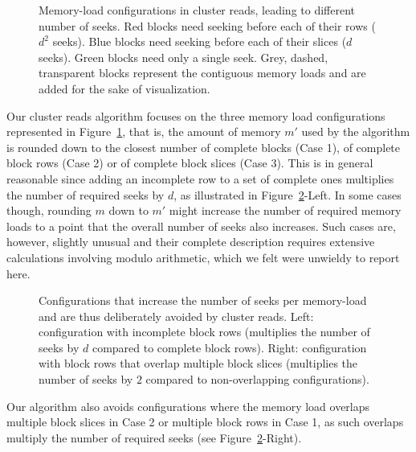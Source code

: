\documentclass[10pt, conference, compsocconf]{IEEEtran}
\begin{document}
\begin{figure}
\centering
\def\svgwidth{0.3\columnwidth}

\def\svgwidth{0.3\columnwidth}

\def\svgwidth{0.3\columnwidth}

\caption{Memory-load configurations in cluster reads, leading to
  different number of seeks. Red blocks need seeking before each of
  their rows ($d^2$ seeks). Blue blocks need seeking before each of
  their slices ($d$ seeks). Green blocks need only a single
  seek. Grey, dashed, transparent blocks represent the contiguous
  memory loads and are added for the sake of visualization.}
\label{fig:cluster-reads}
\end{figure}
Our cluster reads algorithm focuses on the three memory load
configurations represented in Figure~\ref{fig:cluster-reads}, that is,
the amount of memory $m'$ used by the algorithm is rounded down to the
closest number of complete blocks (Case 1), of complete block rows (Case
2) or of complete block slices (Case 3). This is in general reasonable
since adding an incomplete row to a set of complete ones multiplies
the number of required seeks by $d$, as illustrated in
Figure~\ref{fig:avoided-configurations}-Left. In some cases though,
rounding $m$ down to $m'$ might increase the number of required
memory loads to a point that the overall number of seeks also
increases. Such cases are, however, slightly unusual and their
complete description requires extensive calculations involving modulo
arithmetic, which we felt were unwieldy to report here.
\begin{figure}
  \centering
\def\svgwidth{0.3\columnwidth}

\quad \quad \quad
\def\svgwidth{0.3\columnwidth}

\caption{Configurations that increase the number of seeks per
  memory-load and are thus deliberately avoided by cluster
  reads. Left: configuration with incomplete block rows (multiplies
  the number of seeks by $d$ compared to complete block rows). Right:
  configuration with block rows that overlap multiple block slices
  (multiplies the number of seeks by $2$ compared to non-overlapping
  configurations).}
\label{fig:avoided-configurations}
\end{figure}

Our algorithm also avoids configurations where the memory load
overlaps multiple block slices in Case 2 or multiple block rows in
Case 1, as such overlaps multiply the number of required seeks (see
Figure~\ref{fig:avoided-configurations}-Right).
\end{document}
